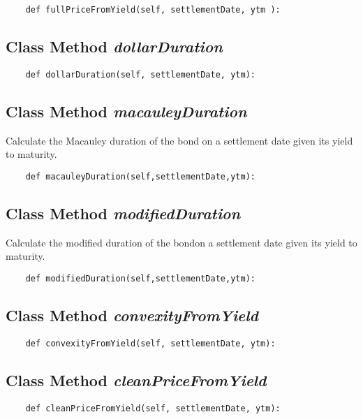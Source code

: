 \documentclass[twoside,11pt]{book}
\begin{document}
\begin{lstlisting}
    def fullPriceFromYield(self, settlementDate, ytm ):
\end{lstlisting}

\subsection{Class Method {\it dollarDuration}}


\begin{lstlisting}
    def dollarDuration(self, settlementDate, ytm):
\end{lstlisting}

\subsection{Class Method {\it macauleyDuration}}
Calculate the Macauley duration of the bond on a settlement date given its yield to maturity. 

\begin{lstlisting}
    def macauleyDuration(self,settlementDate,ytm):
\end{lstlisting}

\subsection{Class Method {\it modifiedDuration}}
Calculate the modified duration of the bondon a settlement date given its yield to maturity. 

\begin{lstlisting}
    def modifiedDuration(self,settlementDate,ytm):
\end{lstlisting}

\subsection{Class Method {\it convexityFromYield}}


\begin{lstlisting}
    def convexityFromYield(self, settlementDate, ytm):
\end{lstlisting}

\subsection{Class Method {\it cleanPriceFromYield}}


\begin{lstlisting}
    def cleanPriceFromYield(self, settlementDate, ytm):
\end{lstlisting}
\end{document}
